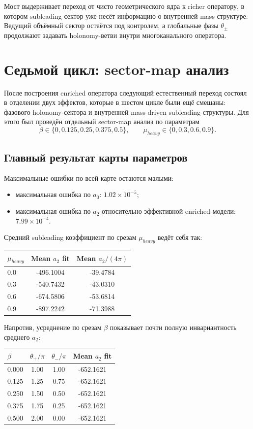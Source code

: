 \documentclass[12pt,a4paper]{article}
\begin{document}
Мост выдерживает переход от чисто геометрического ядра к richer оператору, в котором subleading-сектор уже несёт информацию о внутренней mass-структуре. Ведущий объёмный сектор остаётся под контролем, а глобальные фазы \(\theta_\pm\) продолжают задавать holonomy-ветви внутри многоканального оператора.

\section{Седьмой цикл: sector-map анализ}

После построения enriched оператора следующий естественный переход состоял в отделении двух эффектов, которые в шестом цикле были ещё смешаны: фазового holonomy-сектора и внутренней mass-driven subleading-структуры. Для этого был проведён отдельный sector-map анализ по параметрам
\[
\beta\in\{0,0.125,0.25,0.375,0.5\},
\qquad
\mu_{heavy}\in\{0,0.3,0.6,0.9\}.
\]

\subsection{Главный результат карты параметров}

Максимальные ошибки по всей карте остаются малыми:
\begin{itemize}
    \item максимальная ошибка по \(a_0\): \(1.02\times 10^{-5}\);
    \item максимальная ошибка по \(a_2\) относительно эффективной enriched-модели: \(7.99\times 10^{-4}\).
\end{itemize}

Средний subleading коэффициент по срезам \(\mu_{heavy}\) ведёт себя так:
\begin{center}
\begin{tabular}{lcc}
\toprule
$\mu_{heavy}$ & Mean $a_2$ fit & Mean $a_2/(4\pi)$ \\
\midrule
0.0 & -496.1004 & -39.4784 \\
0.3 & -540.7432 & -43.0310 \\
0.6 & -674.5806 & -53.6814 \\
0.9 & -897.2242 & -71.3988 \\
\bottomrule
\end{tabular}
\end{center}

Напротив, усреднение по срезам \(\beta\) показывает почти полную инвариантность среднего \(a_2\):
\begin{center}
\begin{tabular}{lccc}
\toprule
$\beta$ & $\theta_+/\pi$ & $\theta_-/\pi$ & Mean $a_2$ fit \\
\midrule
0.000 & 1.00 & 1.00 & -652.1621 \\
0.125 & 1.25 & 0.75 & -652.1621 \\
0.250 & 1.50 & 0.50 & -652.1621 \\
0.375 & 1.75 & 0.25 & -652.1621 \\
0.500 & 2.00 & 0.00 & -652.1621 \\
\bottomrule
\end{tabular}
\end{center}
\end{document}
